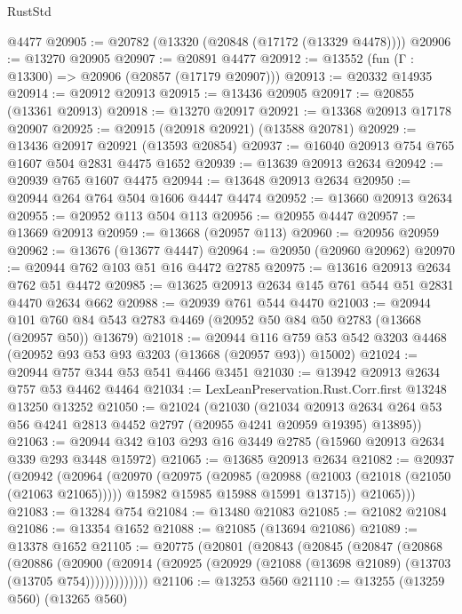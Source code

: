 \begin{lexlean}{RustStd}
\begin{coremodule}
    @4477
@20905 := @20782 (@13320 (@20848 (@17172 (@13329 @4478))))
@20906 := @13270 @20905
@20907 := @20891 @4477
@20912 := @13552 (fun (Γ : @13300) => @20906 (@20857 (@17179 @20907)))
@20913 := @20332 @14935
@20914 := @20912 @20913
@20915 := @13436 @20905
@20917 := @20855 (@13361 @20913)
@20918 := @13270 @20917
@20921 := @13368 @20913 @17178 @20907
@20925 := @20915 (@20918 @20921) (@13588 @20781)
@20929 := @13436 @20917 @20921 (@13593 @20854)
@20937 := @16040 @20913 @754 @765 @1607 @504 @2831 @4475 @1652
@20939 := @13639 @20913 @2634
@20942 := @20939 @765 @1607 @4475
@20944 := @13648 @20913 @2634
@20950 := @20944 @264 @764 @504 @1606 @4447 @4474
@20952 := @13660 @20913 @2634
@20955 := @20952 @113 @504 @113
@20956 := @20955 @4447
@20957 := @13669 @20913
@20959 := @13668 (@20957 @113)
@20960 := @20956 @20959
@20962 := @13676 (@13677 @4447)
@20964 := @20950 (@20960 @20962)
@20970 := @20944 @762 @103 @51 @16 @4472 @2785
@20975 := @13616 @20913 @2634 @762 @51 @4472
@20985 := @13625 @20913 @2634 @145 @761 @544 @51 @2831 @4470 @2634 @662
@20988 := @20939 @761 @544 @4470
@21003 := @20944
    @101
    @760
    @84
    @543
    @2783
    @4469
    (@20952 @50 @84 @50 @2783 (@13668 (@20957 @50)) @13679)
@21018 := @20944
    @116
    @759
    @53
    @542
    @3203
    @4468
    (@20952 @93 @53 @93 @3203 (@13668 (@20957 @93)) @15002)
@21024 := @20944 @757 @344 @53 @541 @4466 @3451
@21030 := @13942 @20913 @2634 @757 @53 @4462 @4464
@21034 := LexLeanPreservation.Rust.Corr.first @13248 @13250 @13252
@21050 := @21024
    (@21030
      (@21034
        @20913
        @2634
        @264
        @53
        @56
        @4241
        @2813
        @4452
        @2797
        (@20955 @4241 @20959 @19395)
        @13895))
@21063 := @20944 @342 @103 @293 @16 @3449 @2785 (@15960 @20913 @2634 @339 @293 @3448 @15972)
@21065 := @13685 @20913 @2634
@21082 := @20937
    (@20942
      (@20964
        (@20970
          (@20975
            (@20985
              (@20988 (@21003 (@21018 (@21050 (@21063 @21065)))))
              @15982
              @15985
              @15988
              @15991
              @13715))
          @21065)))
@21083 := @13284 @754
@21084 := @13480 @21083
@21085 := @21082 @21084
@21086 := @13354 @1652
@21088 := @21085 (@13694 @21086)
@21089 := @13378 @1652
@21105 := @20775
    (@20801
      (@20843
        (@20845
          (@20847
            (@20868
              (@20886
                (@20900
                  (@20914 (@20925 (@20929 (@21088 (@13698 @21089) (@13703 (@13705 @754)))))))))))))
@21106 := @13253 @560
@21110 := @13255 (@13259 @560) (@13265 @560)

\end{coremodule}
\end{lexlean}
